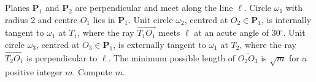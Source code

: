 Planes $\mathbf{P}_1$ and $\mathbf{P}_2$ are perpendicular and meet along the line $\ell$. Circle $\omega_1$ with radius $2$ and centre $O_1$ lies in $\mathbf{P}_1$. Unit circle $\omega_2$, centred at $O_2\in\mathbf{P}_1$, is internally tangent to $\omega_1$ at $T_1$, where the ray $\overrightarrow{T_1O_1}$ meets $\ell$ at an acute angle of $30^\circ$. Unit circle $\omega_3$, centred at $O_3\in\mathbf{P}_1$, is externally tangent to $\omega_1$ at $T_2$, where the ray $\overrightarrow{T_2O_1}$ is perpendicular to $\ell$. The minimum possible length of $\overline{O_2O_3}$ is $\sqrt m$ for a positive integer $m$. Compute $m$.
